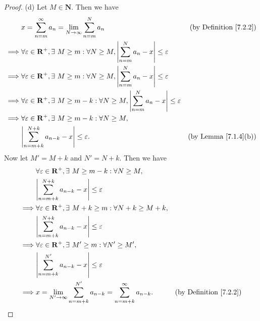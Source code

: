 \begin{proof}{(d)}
    Let \(M \in \mathbf{N}\).
    Then we have
    \begin{align*}
                 & x = \sum_{n = m}^\infty a_n = \lim_{N \to \infty} \sum_{n = m}^N a_n                                                           & \text{(by Definition \ref{7.2.2})} \\
        \implies & \forall \varepsilon \in \mathbf{R}^+, \exists\ M \geq m : \forall N \geq M, \abs*{\sum_{n = m}^N a_n - x} \leq \varepsilon                                          \\
        \implies & \forall \varepsilon \in \mathbf{R}^+, \exists\ M \geq m : \forall N \geq M, \abs*{\sum_{n = m}^N a_n - x} \leq \varepsilon                                          \\
        \implies & \forall \varepsilon \in \mathbf{R}^+, \exists\ M \geq m - k : \forall N \geq M, \abs*{\sum_{n = m}^N a_n - x} \leq \varepsilon                                      \\
        \implies & \forall \varepsilon \in \mathbf{R}^+, \exists\ M \geq m - k : \forall N \geq M,                                                                                     \\
                 & \abs*{\sum_{n = m + k}^{N + k} a_{n - k} - x} \leq \varepsilon.                                                                & \text{(by Lemma \ref{7.1.4}(b))}
    \end{align*}
    Now let \(M' = M + k\) and \(N' = N + k\).
    Then we have
    \begin{align*}
                 & \forall \varepsilon \in \mathbf{R}^+, \exists\ M \geq m - k : \forall N \geq M,                                                    \\
                 & \abs*{\sum_{n = m + k}^{N + k} a_{n - k} - x} \leq \varepsilon                                                                     \\
        \implies & \forall \varepsilon \in \mathbf{R}^+, \exists\ M + k \geq m : \forall N + k \geq M + k,                                            \\
                 & \abs*{\sum_{n = m + k}^{N + k} a_{n - k} - x} \leq \varepsilon                                                                     \\
        \implies & \forall \varepsilon \in \mathbf{R}^+, \exists\ M' \geq m : \forall N' \geq M',                                                     \\
                 & \abs*{\sum_{n = m + k}^{N'} a_{n - k} - x} \leq \varepsilon                                                                        \\
        \implies & x = \lim_{N' \to \infty} \sum_{n = m + k}^{N'} a_{n - k} = \sum_{n = m + k}^\infty a_{n - k}. & \text{(by Definition \ref{7.2.2})}
    \end{align*}
\end{proof}

